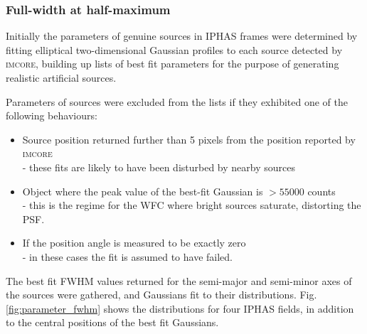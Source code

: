 \documentclass[a4paper,useAMS,usenatbib]{mn2e}
\begin{document}
\subsubsection{Full-width at half-maximum}
\label{subsubsec:parameter_fwhm}
Initially the parameters of genuine sources in IPHAS frames were determined by
fitting elliptical two-dimensional Gaussian profiles to each source detected by
\textsc{imcore}, building up lists of best fit parameters for the purpose of
generating realistic artificial sources.

Parameters of sources were excluded from the lists if they exhibited one of the
following behaviours: \begin{itemize}\itemsep \item Source position returned
further than 5 pixels from the position reported by \textsc{imcore} \\- these
fits are likely to have been disturbed by nearby sources \item Object where the
peak value of the best-fit Gaussian is $>55000$ counts \\- this is the regime
for the WFC where bright sources saturate, distorting the PSF. \item If the
position angle is measured to be exactly zero \\- in these cases the fit is
assumed to have failed. \end{itemize}

The best fit FWHM values returned for the semi-major and semi-minor axes of the
sources were gathered, and Gaussians fit to their distributions. Fig.
\ref{fig:parameter_fwhm} shows the distributions for four IPHAS fields, in
addition to the central positions of the best fit Gaussians.
\end{document}
